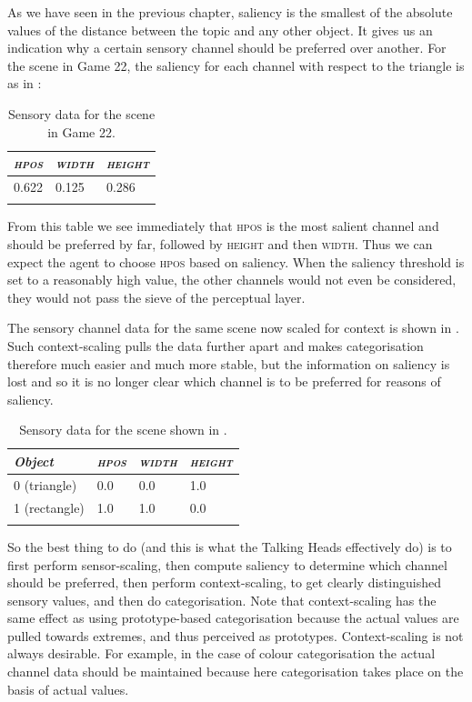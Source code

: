 As we have seen in the previous chapter, 
saliency is the smallest of the absolute values     
of the distance between the topic and any
other object. It gives us an indication why 
a certain sensory channel should be preferred
over another. For the scene in Game 22, the saliency for each channel with 
respect to the triangle is as in : 

\begin{table}
\begin{center}
\begin{tabular}{ l  l  l }
\lsptoprule
{\itshape \textsc{hpos}} & {\itshape \textsc{width}} & {\itshape \textsc{height}} \\ \midrule
 0.622 & 0.125 & 0.286  \\ 
\lspbottomrule
\end{tabular}
\caption{\label{tab:t-game22-sal}Sensory data for the scene in Game 22.}
\end{center}
\end{table}
From this table we see immediately that \textsc{hpos} is the 
most salient channel and should be preferred by far, followed
by \textsc{height} and then \textsc{width}. Thus we can expect the
agent to choose \textsc{hpos} based on saliency. When the saliency threshold
is set to a reasonably high value, the other channels
would not even be considered, they would not pass the 
sieve of the perceptual layer. 

The sensory channel data for the 
same scene now scaled for context is shown in . Such context-scaling 
pulls the data further apart and makes categorisation 
therefore much easier and much more 
stable, but the information on saliency is lost and so 
it is no longer clear which channel is to be preferred
for reasons of saliency. 

\begin{table}
\begin{center}
\begin{tabular}{ l  l  l  l }
\lsptoprule
{\itshape Object} & {\itshape \textsc{hpos}} & {\itshape \textsc{width}} & {\itshape \textsc{height}} \\ \midrule
0 (triangle) & 0.0 & 0.0 & 1.0  \\ 
1 (rectangle) & 1.0 & 1.0 & 0.0 \\  
\lspbottomrule
\end{tabular}
\caption{\label{tab:t-game22scaled}Sensory data for the scene shown in .}
\end{center}
\end{table}
So the best thing to do (and this is what the Talking Heads 
effectively do) is to first perform sensor-scaling, then 
compute saliency to determine which channel should be 
preferred, then perform context-scaling, to get clearly 
distinguished sensory values, and then do categorisation. 
Note that context-scaling has the same effect as using 
prototype-based categorisation because the actual values 
are pulled towards extremes, and thus perceived as 
prototypes. Context-scaling is not always desirable. For example, 
in the case of colour categorisation the actual channel
data should be maintained because here categorisation 
takes place on the basis of actual values. 

